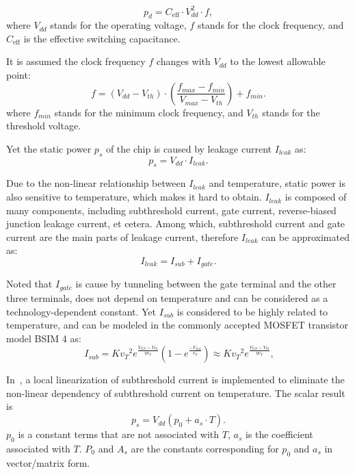 \begin{equation}\label{eq:dyn_power}
p_{d} = C_{\text{eff}} \cdot V_{dd}^{2} \cdot f,
\end{equation}
where $V_{dd}$ stands for the operating voltage, $f$ stands for the clock frequency, and $C_{\text{eff}}$ is the effective switching capacitance.

It is assumed the clock frequency $f$ changes with $V_{dd}$ to the lowest allowable point:
\begin{equation}\label{eq:f_v}
f = (V_{dd}-V_{th}) \cdot (\frac{f_{max}-f_{min}}{V_{max}-V_{th}})+f_{min}.
\end{equation}
where $f_{min}$ stands for the minimum clock frequency, and $V_{th}$ stands for the threshold voltage.

Yet the static power $p_{s}$ of the chip is caused by leakage current $I_{leak}$ as:
\begin{equation}\label{eq:sta_power}
p_{s} =V_{dd} \cdot I_{leak}.
\end{equation}

Due to the non-linear relationship between $I_{leak}$ and temperature, static power is also sensitive to temperature, which makes it hard to obtain. $I_{leak}$ is composed of many components, including subthreshold current, gate current, reverse-biased junction leakage current, et cetera. Among which, subthreshold current and gate current are the main parts of leakage current, therefore $I_{leak}$ can be approximated as:
\begin{equation}\label{eq:leakage}
I_{leak}=I_{sub}+I_{gate}.
\end{equation}

Noted that $I_{gate}$ is cause by tunneling between the gate terminal and the other three terminals, does not depend on temperature and can be considered as a technology-dependent constant. Yet $I_{sub}$ is considered to be highly related to temperature, and can be modeled in the commonly accepted MOSFET transistor model BSIM 4 as:
\begin{equation}\label{eq:sub_current}\
I_{sub}=K {v_T}^2e^{\frac{V_{GS}-V_{th}}{\eta v_T}}
  (1-e^{\frac{-V_{DS}}{v_T}}) \approx K {v_T}^2e^{\frac{V_{GS}-V_{th}}{\eta v_T}},
\end{equation}

In~\cite{WangWan:TOC'18}, a local linearization of subthreshold current is implemented to eliminate the non-linear dependency of subthreshold current on temperature. The scalar result is
\begin{equation}\label{eq:lin_leakage}
p_{s} =V_{dd} (p_{0}+a_{s} \cdot T).
\end{equation}
$p_{0}$ is a constant terms that are not associated with $T$, $a_{s}$ is the coefficient associated with $T$. $P_{0}$ and $A_{s}$ are the constants corresponding for $p_{0}$ and $a_{s}$ in vector/matrix form.


